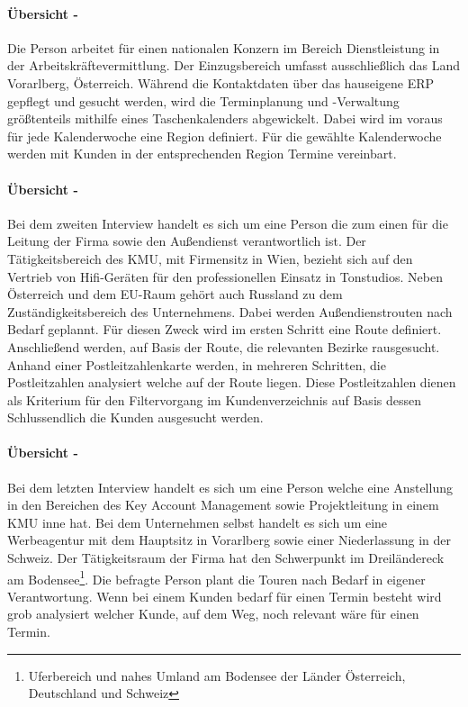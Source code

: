 \documentclass[Bachelorarbeit.tex]{subfiles}
\begin{document}
\paragraph*{Übersicht - } Die Person arbeitet für einen nationalen Konzern im Bereich Dienstleistung in der Arbeitskräftevermittlung. 
Der Einzugsbereich umfasst ausschließlich das Land Vorarlberg, Österreich.
Während die Kontaktdaten über das hauseigene \ac{ERP} gepflegt und gesucht werden, wird die Terminplanung und -Verwaltung größtenteils mithilfe eines Taschenkalenders abgewickelt.
Dabei wird im voraus für jede Kalenderwoche eine Region definiert. 
Für die gewählte Kalenderwoche werden mit Kunden in der entsprechenden Region Termine vereinbart.


\paragraph*{Übersicht - }
Bei dem zweiten Interview handelt es sich um eine Person die zum einen für die Leitung der Firma sowie den Außendienst verantwortlich ist.
Der Tätigkeitsbereich des \ac{KMU}, mit Firmensitz in Wien, bezieht sich auf den Vertrieb von Hifi-Geräten für den professionellen Einsatz in Tonstudios.
Neben Österreich und dem EU-Raum gehört auch Russland zu dem Zuständigkeitsbereich des Unternehmens.
Dabei werden Außendienstrouten nach Bedarf geplannt.
Für diesen Zweck wird im ersten Schritt eine Route definiert. 
Anschließend werden, auf Basis der Route, die relevanten Bezirke rausgesucht.
Anhand einer Postleitzahlenkarte werden, in mehreren Schritten, die Postleitzahlen analysiert welche auf der Route liegen.
Diese Postleitzahlen dienen als Kriterium für den Filtervorgang im Kundenverzeichnis auf Basis dessen Schlussendlich die Kunden ausgesucht werden.

\paragraph*{Übersicht - }
Bei dem letzten Interview handelt es sich um eine Person welche eine Anstellung in den Bereichen des Key Account Management sowie Projektleitung in einem \ac{KMU} inne hat.
Bei dem Unternehmen selbst handelt es sich um eine Werbeagentur mit dem Hauptsitz in Vorarlberg sowie einer Niederlassung in der Schweiz.
Der Tätigkeitsraum der Firma hat den Schwerpunkt im Dreiländereck am Bodensee\footnote{Uferbereich und nahes Umland am Bodensee der Länder Österreich, Deutschland und Schweiz}. 
Die befragte Person plant die Touren nach Bedarf in eigener Verantwortung.
Wenn bei einem Kunden bedarf für einen Termin besteht wird grob analysiert welcher Kunde, auf dem Weg, noch relevant wäre für einen Termin.
\end{document}
